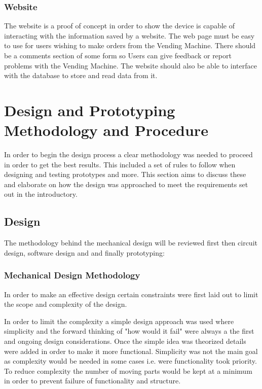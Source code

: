 \documentclass[a4paper,11pt]{article}
\numberwithin{figure}{subsection}
\begin{document}
\subsubsection{Website}
The website is a proof of concept in order to show the device is capable of interacting with the information saved by a website. The web page must be easy to use for users wishing to make orders from the Vending Machine. There should be a comments section of some form so Users can give feedback or report problems with the Vending Machine. The website should also be able to interface with the database to store and read data from it.

\newpage
\section{Design and Prototyping Methodology and Procedure}
	In order to begin the design process a clear methodology was needed to proceed in order to get the best results. This included a set of rules to follow when designing and testing prototypes and more. This section aims to discuss these and elaborate on how the design was approached to meet the requirements set out in the introductory.

\subsection{Design}
The methodology behind the mechanical design will be reviewed first then circuit design, software design and and finally prototyping:
\subsubsection{Mechanical Design Methodology}
In order to make an effective design certain constraints were first laid out to limit the scope and complexity of the design.

In order to limit the complexity a simple design approach was used where simplicity and the forward thinking of "how would it fail" were always a the first and ongoing design considerations. Once the simple idea was theorized details were added in order to make it more functional. Simplicity was not the main goal as complexity would be needed in some cases i.e. were functionality took priority. To reduce complexity the number of moving parts would be kept at a minimum in order to prevent failure of functionality and structure. 
\end{document}
